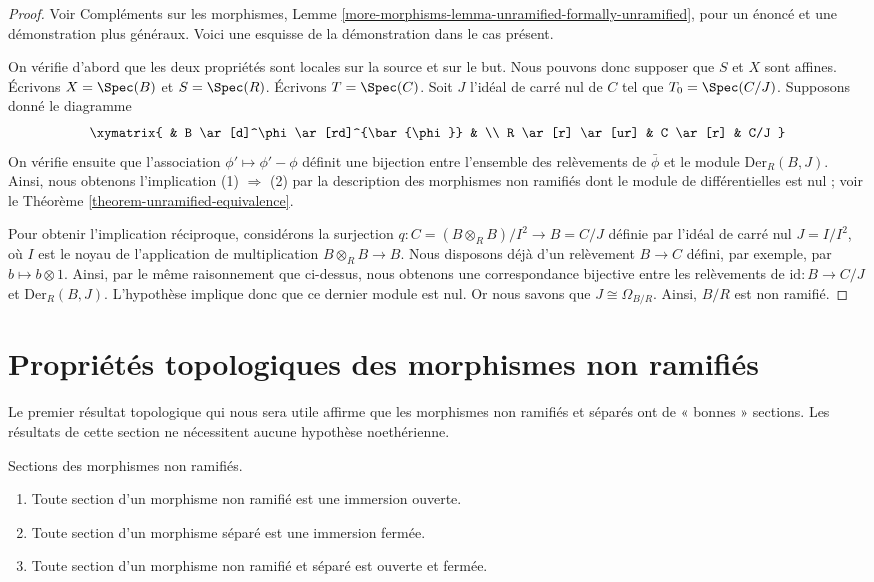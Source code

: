\begin{proof}
Voir Compléments sur les morphismes,
Lemme \ref{more-morphisms-lemma-unramified-formally-unramified},
pour un énoncé et une démonstration plus généraux.
Voici une esquisse de la démonstration dans le cas présent.

\medskip\noindent
On vérifie d'abord que les deux propriétés sont locales sur la source et sur le but.
Nous pouvons donc supposer que $S$ et $X$ sont affines.
Écrivons $X = \Spec(B)$ et $S = \Spec(R)$.
Écrivons $T = \Spec(C)$. Soit $J$ l'idéal de carré nul de $C$
tel que $T_0 = \Spec(C/J)$. Supposons donné le diagramme
$$
\xymatrix{
& B \ar[d]^\phi \ar[rd]^{\bar{\phi}}
& \\
R \ar[r] \ar[ur] & C \ar[r]
& C/J
}
$$
On vérifie ensuite que l'association $\phi' \mapsto \phi' - \phi$
définit une bijection entre l'ensemble des relèvements de $\bar{\phi}$ et le module
$\text{Der}_R(B, J)$. Ainsi, nous obtenons l'implication (1) $\Rightarrow$ (2)
par la description des morphismes non ramifiés dont le module
de différentielles est nul ; voir le Théorème \ref{theorem-unramified-equivalence}.

\medskip\noindent
Pour obtenir l'implication réciproque, considérons la surjection
$q : C = (B \otimes_R B)/I^2 \to B = C/J$ définie par l'idéal de carré nul
$J = I/I^2$, où $I$ est le noyau de l'application de multiplication
$B \otimes_R B \to B$. Nous disposons déjà d'un relèvement $B \to C$ défini, par exemple,
par $b \mapsto b \otimes 1$. Ainsi, par le même raisonnement que ci-dessus, nous obtenons une
correspondance bijective entre les relèvements de $\text{id} : B \to C/J$ et
$\text{Der}_R(B, J)$. L'hypothèse implique donc que ce dernier module est
nul. Or nous savons que $J \cong \Omega_{B/R}$. Ainsi, $B/R$ est non ramifié.
\end{proof}



\section{Propriétés topologiques des morphismes non ramifiés}
\label{section-topological-unramified}

\noindent
Le premier résultat topologique qui nous sera utile affirme
que les morphismes non ramifiés et séparés ont de « bonnes » sections.
Les résultats de cette section ne nécessitent aucune hypothèse noethérienne.

\begin{proposition}
\label{proposition-properties-sections}
Sections des morphismes non ramifiés.
\begin{enumerate}
\item Toute section d'un morphisme non ramifié est une immersion ouverte.
\item Toute section d'un morphisme séparé est une immersion fermée.
\item Toute section d'un morphisme non ramifié et séparé est ouverte et fermée.
\end{enumerate}
\end{proposition}

